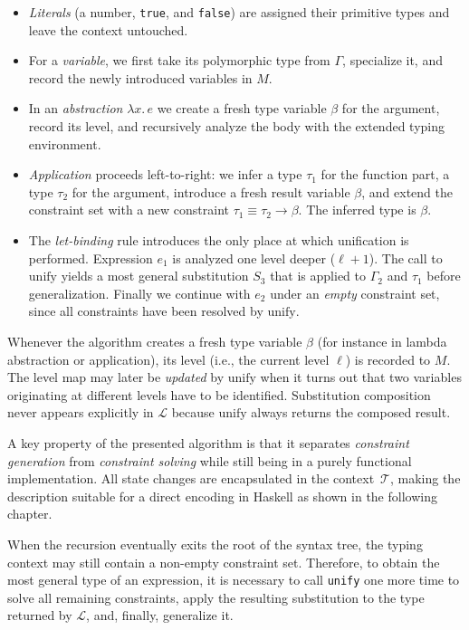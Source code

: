 \begin{itemize}
  \item \emph{Literals} (a number, \texttt{true}, and \texttt{false}) are assigned their primitive types and leave the context untouched.
  \item For a \emph{variable}, we first take its polymorphic type from $\Gamma$, specialize it, and record the newly introduced variables in $M$.
  \item In an \emph{abstraction} $\lambda x.\,e$ we create a fresh type variable $\beta$ for the argument, record its level, and recursively analyze the body with the extended typing environment.
  \item \emph{Application} proceeds left-to-right: we infer a type $\tau_1$ for the function part, a type $\tau_2$ for the argument, introduce a fresh result variable $\beta$, and extend the constraint set with a new constraint $\tau_1\equiv \tau_2\to\beta$. The inferred type is $\beta$.
  \item The \emph{let-binding} rule introduces the only place at which unification is performed. Expression $e_1$ is analyzed one level deeper (\(\ell\!+\!1\)). The call to $\mathrm{unify}$ yields a most general substitution $S_3$ that is applied to $\Gamma_2$ and $\tau_1$ before generalization. Finally we continue with $e_2$ under an \emph{empty} constraint set, since all constraints have been resolved by $\mathrm{unify}$.
\end{itemize}

Whenever the algorithm creates a fresh type variable $\beta$ (for instance in lambda abstraction or application), its level (i.e., the current level $\ell$) is recorded to $M$. The level map may later be \emph{updated} by $\mathrm{unify}$ when it turns out that two variables originating at different levels have to be identified. Substitution composition never appears explicitly in $\mathcal{L}$ because $\mathrm{unify}$ always returns the composed result.

A key property of the presented algorithm is that it separates \emph{constraint generation} from \emph{constraint solving} while still being in a purely functional implementation.  All state changes are encapsulated in the context~$\mathcal{T}$, making the description suitable for a direct encoding in Haskell as shown in the following chapter.

When the recursion eventually exits the root of the syntax tree, the typing context may still contain a non-empty constraint set. Therefore, to obtain the most general type of an expression, it is necessary to call \texttt{unify} one more time to solve all remaining constraints, apply the resulting substitution to the type returned by $\mathcal{L}$, and, finally, generalize it.

